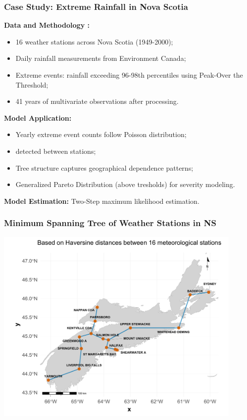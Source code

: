 \documentclass[11pt,xcolor={dvipsnames},hyperref={pdftex,pdfpagemode=UseNone,hidelinks,pdfdisplaydoctitle=true},usepdftitle=false]{beamer}
\begin{document}
\begin{frame}[label=backupSlide]
\frametitle{Case Study: Extreme Rainfall in Nova Scotia}
\textbf{Data and Methodology \citep{murphy2025multivariate}:}
\begin{itemize}
    \item 16 weather stations across Nova Scotia (1949-2000);
    \item Daily rainfall measurements from Environment Canada;
    \item Extreme events: rainfall exceeding 96-98th percentiles using Peak-Over the Threshold;
    \item 41 years of multivariate observations after processing.
\end{itemize}

\vspace{0.3cm}
\textbf{Model Application:}
\begin{itemize}
    \item Yearly extreme event counts follow Poisson distribution;
    \item {} detected between stations;
    \item Tree structure captures geographical dependence patterns;
    \item Generalized Pareto Distribution (above tresholds) for severity modeling.
\end{itemize}

\vspace{0.3cm}
\textbf{Model Estimation:} Two-Step maximum likelihood estimation. 
\end{frame}

\begin{frame}[label=anotherBackupSlide]
\frametitle{Minimum Spanning Tree of Weather Stations in NS}
\includegraphics[width=0.9\textwidth]{Figures/mst_station_map_v2.pdf}
\end{frame}
\end{document}
